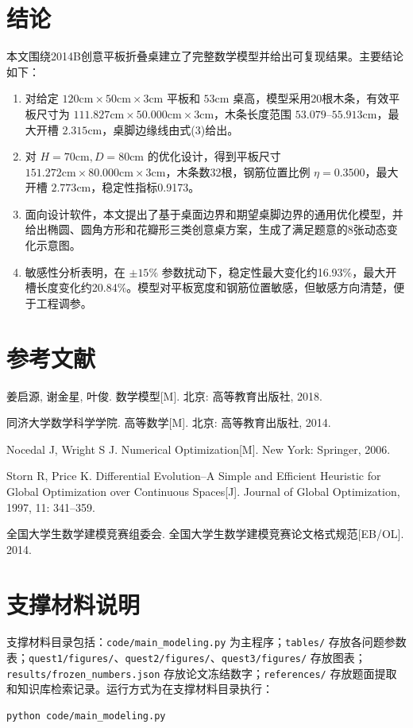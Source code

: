 \documentclass[UTF8,a4paper,12pt]{ctexart}
\newcommand{\cm}{\mathrm{cm}}
\begin{document}
\section{结论}
本文围绕2014B创意平板折叠桌建立了完整数学模型并给出可复现结果。主要结论如下：
\begin{enumerate}
\item 对给定 $120\cm\times50\cm\times3\cm$ 平板和 $53\cm$ 桌高，模型采用20根木条，有效平板尺寸为 $111.827\cm\times50.000\cm\times3\cm$，木条长度范围 $53.079$--$55.913\cm$，最大开槽 $2.315\cm$，桌脚边缘线由式(3)给出。
\item 对 $H=70\cm,D=80\cm$ 的优化设计，得到平板尺寸 $151.272\cm\times80.000\cm\times3\cm$，木条数32根，钢筋位置比例 $\eta=0.3500$，最大开槽 $2.773\cm$，稳定性指标0.9173。
\item 面向设计软件，本文提出了基于桌面边界和期望桌脚边界的通用优化模型，并给出椭圆、圆角方形和花瓣形三类创意桌方案，生成了满足题意的8张动态变化示意图。
\item 敏感性分析表明，在 $\pm15\%$ 参数扰动下，稳定性最大变化约16.93\%，最大开槽长度变化约20.84\%。模型对平板宽度和钢筋位置敏感，但敏感方向清楚，便于工程调参。
\end{enumerate}

\section*{参考文献}
\begin{enumerate}[label={[\arabic*]}]
\item 姜启源, 谢金星, 叶俊. 数学模型[M]. 北京: 高等教育出版社, 2018.
\item 同济大学数学科学学院. 高等数学[M]. 北京: 高等教育出版社, 2014.
\item Nocedal J, Wright S J. Numerical Optimization[M]. New York: Springer, 2006.
\item Storn R, Price K. Differential Evolution--A Simple and Efficient Heuristic for Global Optimization over Continuous Spaces[J]. Journal of Global Optimization, 1997, 11: 341--359.
\item 全国大学生数学建模竞赛组委会. 全国大学生数学建模竞赛论文格式规范[EB/OL]. 2014.
\end{enumerate}

\appendix
\section{支撑材料说明}
支撑材料目录包括：\texttt{code/main\_modeling.py} 为主程序；\texttt{tables/} 存放各问题参数表；\texttt{quest1/figures/}、\texttt{quest2/figures/}、\texttt{quest3/figures/} 存放图表；\texttt{results/frozen\_numbers.json} 存放论文冻结数字；\texttt{references/} 存放题面提取和知识库检索记录。运行方式为在支撑材料目录执行：
\begin{verbatim}
python code/main_modeling.py
\end{verbatim}
\end{document}
